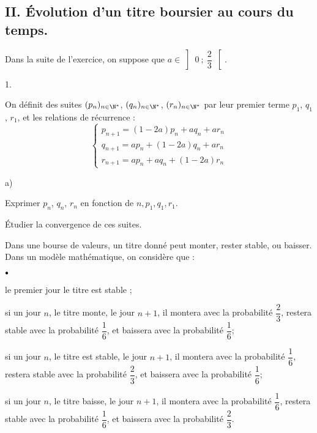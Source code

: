 \documentclass[11pt]{article}%
\begin{document}
\subsection*{II. \textbf{Évolution d'un titre boursier au cours du
temps.}}

Dans la suite de l'exercice, on suppose que $a\in \left]\ 0\ ;\
\dfrac{2}{3}\
\right[ $.

\begin{noliste}{1.}
 \setlength{\itemsep}{4mm}
\item On définit des suites $(p_{n})_{n\in \N^{\ast }}$, $
(q_{n})_{n\in \N^{\ast }}$, $(r_{n})_{n\in \N^{\ast }}$ par
leur premier terme $p_{1}$, $q_{1}$, $r_{1}$, et les relations de
récurrence : 
\[
\left\{
\begin{array}{cl}
p_{n + 1} = (1-2a)p_{n} + aq_{n} + ar_{n} \\
q_{n + 1} = ap_{n} + (1-2a)q_{n} + ar_{n} \\
r_{n + 1} = ap_{n} + aq_{n} + (1-2a)r_{n}
\end{array}
\right.
\]

\begin{noliste}{a)}
 \setlength{\itemsep}{2mm}
\item Exprimer $p_{n}$, $q_{n}$, $r_{n}$ en fonction de $
n,p_{1},q_{1},r_{1}. $

\item Étudier la convergence de ces suites.
\end{noliste}

\item Dans une bourse de valeurs, un titre donné peut monter, rester
stable,
ou baisser. Dans un modèle mathématique, on considère que :

\begin{noliste}{$\scriptstyle \bullet$}
\item le premier jour le titre est stable ;

\item si un jour $n$, le titre monte, le jour $n + 1$, il montera avec
la
probabilité $\dfrac{2}{3}$, restera stable avec la probabilité
$\dfrac{1}{6}$, et baissera avec la probabilité $\dfrac{1}{6}$;

\item si un jour $n$, le titre est stable, le jour $n + 1$, il montera
avec la
probabilité $\dfrac{1}{6}$, restera stable avec la probabilité
$\dfrac{2}{3}$, et baissera avec la probabilité $\dfrac{1}{6}$;

\item si un jour $n$, le titre baisse, le jour $n + 1$, il montera avec
la
probabilité $\dfrac{1}{6}$, restera stable avec la probabilité
$\dfrac{1}{6}$, et baissera avec la probabilité $\dfrac{2}{3}$.
\end{noliste}


\end{noliste}
\end{document}
